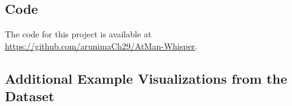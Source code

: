 \documentclass[../report.tex]{subfiles}
\begin{document}
    \subsection{Code}
    The code for this project is available at \url{https://github.com/arunimaCh29/AtMan-Whisper}.

    \subsection{Additional Example Visualizations from the Dataset}

    
    
\end{document}
